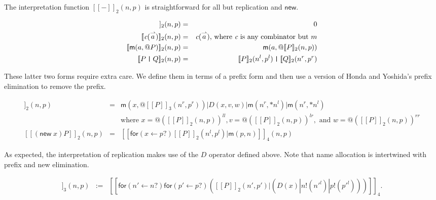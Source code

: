 \documentclass[submission,copyright,creativecommons]{eptcs}
\makeatletter
\newcommand{\new}{\mathsf{new}}
\newcommand{\ldb}{[\![}
\newcommand{\rdb}{]\!]}
\newcommand{\id}[1]{\texttt{#1}}
\newcommand{\pzero}{\mathbin{0}}
\newcommand{\juxtap}{\mathbin{\id{|}}}
\newcommand{\binpar}[2]{#1 | #2}
\newcommand{\outputp}[2]{#1!(#2)}
\newcommand{\prefix}[3]{\mathsf{for}(#2 \leftarrow #1?) #3}
\newcommand{\quotep}[1]{\mathsf{@}#1}
\newcommand{\meaningof}[1]{\ldb #1 \rdb}
\newcommand{\vect}[1]{\stackrel{\rightharpoonup}{#1}}
\theoremstyle{definition}
\theoremstyle{remark}
\theoremstyle{remark}
\makeatother
\begin{document}
The interpretation function $\meaningof{-}_2(n, p)$ is straightforward
for all but replication and $\mathsf{new}$.

\begin{eqnarray*}
    \meaningof{\pzero}_2 (n,p)
      & = &
       \pzero \\
    \meaningof{\emph{c}(\vect{a})}_2 (n,p) 
      & = & 
      \emph{c}(\vect{a})\mbox{, where $\emph{c}$ is any combinator but $m$} \\
    \meaningof{\mathsf{m}(a,\quotep{P})}_2 (n,p) 
      & = & 
          \mathsf{m}(a, \quotep{\meaningof{P}}_2 (n,p)) \\
    \meaningof{P \juxtap Q}_2 (n,p) 
      & = & 
    \meaningof{P}_2 (n^l, p^l)
         \juxtap \meaningof{Q}_2 (n^r, p^r) \\ 
\end{eqnarray*}

These latter two forms require extra care. We define them in terms of
a prefix form and then use a version of Honda and Yoshida's prefix elimination
to remove the prefix.

\begin{eqnarray*}
    \meaningof{\mathsf{*} P}_2 (n,p)
          & = & \binpar{\mathsf{m}(x, \quotep{\meaningof{P}_3(n^r,p^r)})}
                  {\binpar{D(x,v,w)}
                    {\binpar{\mathsf{m}(n^r, *n^l)}{\mathsf{m}(n^r, *n^l)}}} \\
                  & & \mbox{where } 
                      x = @(\meaningof{P}_2(n,p))^{ll}, 
                      v = @(\meaningof{P}_2(n,p))^{lr}, \mbox{ and }
                      w = @(\meaningof{P}_2(n,p))^{rr} \\
    \meaningof{(\new \; x ) P}_2 (n, p) 
          & = & 
         \meaningof{\prefix{p}{x}{\binpar{\meaningof{P}_2 ( n^l, p^l )}{\mathsf{m}(p, n)}}}_4(n, p)
\end{eqnarray*}

As expected, the interpretation of replication makes use of the $D$
operator defined above. Note that name allocation is intertwined with
prefix and new elimination.
         
\begin{eqnarray*}
  \meaningof{P}_3(n, p) 
    & := & 
      \meaningof{\prefix{n}{n'}{\prefix{p}{p'}{(\binpar{\meaningof{P}_2(n',p')}
        {(\binpar{D(x)}{\binpar{\outputp{n}{n'^l}}{\outputp{p}{p'^l}}})})}}}_4. \\
\end{eqnarray*}
\end{document}
